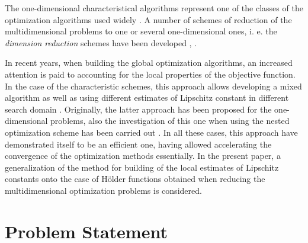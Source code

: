 \documentclass[procedia]{easychair}
\begin{document}
The one-dimensional characteristical algorithms represent one of the classes of the
optimization algorithms used widely \cite{optHandbook}. A number of schemes of reduction of the
multidimensional problems to one or several one-dimensional ones, i. e. the \textit{dimension
reduction} schemes have been developed \cite{stronginBook}, \cite{butzCurves}.
\par
In recent years, when building the global optimization algorithms, an increased attention
is paid to accounting for the local properties of the objective function. In the
case of the characteristic schemes, this approach allows developing a mixed algorithm
\cite{mixedAlg} as well as using different estimates of Lipschitz constant in different search
domain \cite{sergLocalTuningFirst}. Originally, the latter approach has been proposed for the one-dimensional
problems, also the investigation of this one when using the nested optimization scheme
has been carried out \cite{nestedLocal}. In all these cases, this approach have demonstrated itself to
be an efficient one, having allowed accelerating the convergence of the
optimization methods essentially. In the present paper, a generalization of the method
for building of the local estimates of Lipschitz constants onto the case of Hölder
functions obtained when reducing the multidimensional optimization problems is considered.

\section{Problem Statement}
\label{sect:problem}
\end{document}
